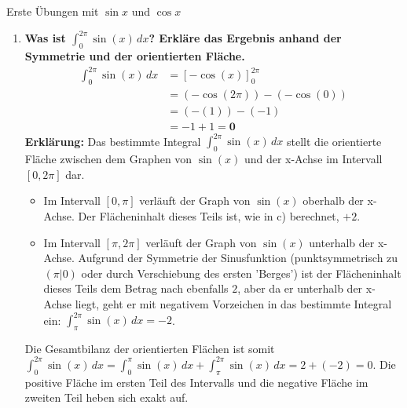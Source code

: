\begin{loesungsumgebung}{Erste Übungen mit $\sin x$ und $\cos x$}
\begin{enumerate}[label=(\alph*)]
    \item \textbf{Was ist $\int_0^{2\pi} \sin(x) \,dx$? Erkläre das Ergebnis anhand der Symmetrie und der orientierten Fläche.}
    \begin{align*} \int_0^{2\pi} \sin(x) \,dx &= [-\cos(x)]_0^{2\pi} \\ &= (-\cos(2\pi)) - (-\cos(0)) \\ &= (-(1)) - (-1) \\ &= -1 + 1 = \mathbf{0} \end{align*}
    \textbf{Erklärung:}
    Das bestimmte Integral $\int_0^{2\pi} \sin(x) \,dx$ stellt die orientierte Fläche zwischen dem Graphen von $\sin(x)$ und der x-Achse im Intervall $[0, 2\pi]$ dar.
    \begin{itemize}
        \item Im Intervall $[0, \pi]$ verläuft der Graph von $\sin(x)$ oberhalb der x-Achse. Der Flächeninhalt dieses Teils ist, wie in c) berechnet, $+2$.
        \item Im Intervall $[\pi, 2\pi]$ verläuft der Graph von $\sin(x)$ unterhalb der x-Achse. Aufgrund der Symmetrie der Sinusfunktion (punktsymmetrisch zu $(\pi|0)$ oder durch Verschiebung des ersten 'Berges') ist der Flächeninhalt dieses Teils dem Betrag nach ebenfalls $2$, aber da er unterhalb der x-Achse liegt, geht er mit negativem Vorzeichen in das bestimmte Integral ein: $\int_{\pi}^{2\pi} \sin(x) \,dx = -2$.
    \end{itemize}
    Die Gesamtbilanz der orientierten Flächen ist somit $\int_0^{2\pi} \sin(x) \,dx = \int_0^{\pi} \sin(x) \,dx + \int_{\pi}^{2\pi} \sin(x) \,dx = 2 + (-2) = 0$.
    Die positive Fläche im ersten Teil des Intervalls und die negative Fläche im zweiten Teil heben sich exakt auf.
\end{enumerate}

\end{loesungsumgebung}



